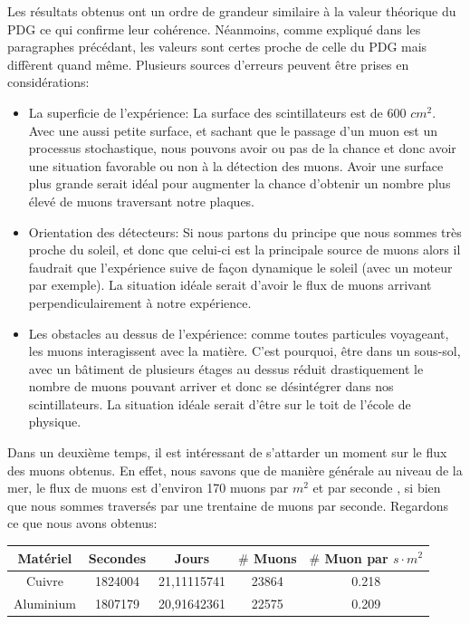 \documentclass[12pt]{article}
\begin{document}
Les résultats obtenus ont un ordre de grandeur similaire à la valeur théorique du PDG ce qui confirme leur cohérence. Néanmoins, comme expliqué dans les paragraphes précédant, les valeurs sont certes proche de celle du PDG mais diffèrent quand même. Plusieurs sources d'erreurs peuvent être prises en considérations: 

\begin{itemize}
    \item La superficie de l'expérience: La surface des scintillateurs est de 600 $cm^{2}$. Avec une aussi petite surface, et sachant que le passage d'un muon est un processus stochastique, nous pouvons avoir ou pas de la chance et donc avoir une situation favorable ou non à la détection des muons. Avoir une surface plus grande serait idéal pour augmenter la chance d'obtenir un nombre plus élevé de muons traversant notre plaques. 
    
    \item Orientation des détecteurs: Si nous partons du principe que nous sommes très proche du soleil, et donc que celui-ci est la principale source de muons alors il faudrait que l'expérience suive de façon dynamique le soleil (avec un moteur par exemple). La situation idéale serait d'avoir le flux de muons arrivant perpendiculairement à notre expérience.
    
    \item Les obstacles au dessus de l'expérience: comme toutes particules voyageant, les muons interagissent avec la matière. C'est pourquoi, être dans un sous-sol, avec un bâtiment de plusieurs étages au dessus réduit drastiquement le nombre de muons pouvant arriver et donc se désintégrer dans nos scintillateurs. La situation idéale serait d'être sur le toit de l'école de physique.
    
\end{itemize}

Dans un deuxième temps, il est intéressant de s'attarder un moment sur le flux des muons obtenus. En effet, nous savons que de manière générale au niveau de la mer, le flux de muons est d’environ 170 muons par $m^{2}$ et par seconde \cite{noauthor_radioactivite_nodate}, si bien que nous sommes traversés par une trentaine de muons par seconde. Regardons ce que nous avons obtenus: 

\begin{center}
\begin{tabular}{||c|c|c|c|c||}
    \hline
     \textbf{Matériel} & \textbf{Secondes} & \textbf{Jours} & \textbf{$\#$ Muons} & \textbf{$\#$ Muon par $s\cdot m^2$}   \\
     \hline\hline
     Cuivre &  1824004 & 21,11115741 & 23864 & 0.218 \\
     \hline
     Aluminium & 1807179 & 20,91642361 & 22575 & 0.209 \\
     \hline
\end{tabular}
\end{center}
\end{document}
